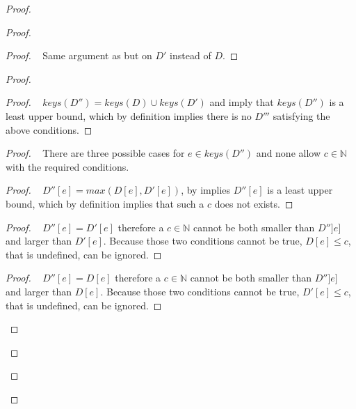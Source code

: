 \documentclass[11pt, oneside]{article}   	%
\begin{document}
\begin{proof}
\begin{proof}
		\begin{proof}
			\pf~ Same argument as  but on $D'$ instead of $D$.
		\end{proof}
		
		\begin{proof}
			\begin{proof}
				\pf~ $\textit{keys}(D'') = \textit{keys}(D) \cup \textit{keys}(D')$ and  imply that $\textit{keys}(D'')$ is a least upper bound, which by definition implies there is no $D'''$ satisfying the above conditions.
			\end{proof}
			
			\begin{proof}
				\pfsketch~ There are three possible cases for $e \in \textit{keys}(D'')$ and none allow $c \in \mathds{N}$ with the required conditions.
				\begin{proof}
					\pf~ $D''[e] = \textit{max}(D[e], D'[e])$, by  implies $D''[e]$ is a least upper bound, which by definition implies that such a $c$ does not exists.
				\end{proof}
				
				\begin{proof}
					\pf~ $D''[e] = D'[e]$ therefore a $c \in \mathds{N}$ cannot be both smaller than $D'']e]$ and larger than $D'[e]$. Because those two conditions cannot be true, $D[e] \leq c$, that is undefined, can be ignored.
				\end{proof}
				
				\begin{proof}
					\pf~ $D''[e] = D[e]$ therefore a $c \in \mathds{N}$ cannot be both smaller than $D'']e]$ and larger than $D[e]$. Because those two conditions cannot be true,  $D'[e] \leq c$, that is undefined, can be ignored.


\end{proof}
\end{proof}
\end{proof}
\end{proof}
\end{proof}
\end{document}
